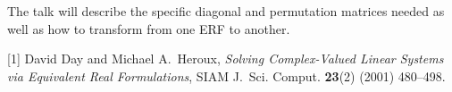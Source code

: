 \documentclass{report}
\begin{document}
The talk will describe
the specific diagonal and permutation matrices needed as
well as how to transform from one ERF to another.

[1] David Day and Michael A.~Heroux,
{\em Solving Complex-Valued Linear Systems
via Equivalent Real Formulations},
SIAM J.~Sci. Comput. {\bf 23}(2) (2001) 480--498.



\end{document}
